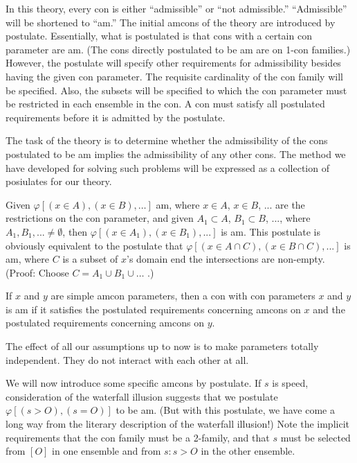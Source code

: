 In this theory, every con is either \enquote{admissible} or \enquote{not admissible.} 
\enquote{Admissible} will be shortened to \enquote{am.} The initial amcons of the theory 
are introduced by postulate. Essentially, what is postulated is that cons with 
a certain con parameter are am. (The cons directly postulated to be am are 
on 1-con families.) However, the postulate will specify other requirements for 
admissibility besides having the given con parameter. The requisite 
cardinality of the con family will be specified. Also, the subsets will be 
specified to which the con parameter must be restricted in each ensemble in 
the con. A con must satisfy all postulated requirements before it is admitted 
by the postulate. 

The task of the theory is to determine whether the admissibility of the 
cons postulated to be am implies the admissibility of any other cons. The 
method we have developed for solving such problems will be expressed as a 
collection of posiulates for our theory. 
\begin{hangers}
 Given $\varphi[(x\in A),(x\in B),\ldots]$ am, where $x\in A$, $x\in B$, ... are the 
restrictions on the con parameter, and given $A_1\subset A$, $B_1\subset B$, ..., where $A_1,B_1,...\neq\emptyset$, then 
$\varphi[(x\in A_1),(x\in B_1),...]$ is am. This postulate is obviously 
equivalent to the postulate that $\varphi[(x\in A\cap C),(x\in B\cap C),...]$ is am, where $C$ is 
a subset of $x$'s domain end the intersections are non-empty. (Proof: Choose 
$C=A_1\cup B_1\cup\ldots$ .) 

 If $x$ and $y$ are simple amcon parameters, then a con with con 
parameters $x$ and $y$ is am if it satisfies the postulated requirements 
concerning amcons on $x$ and the postulated requirements concerning amcons 
on $y$. 
\end{hangers}

The effect of all our assumptions up to now is to make parameters 
totally independent. They do not interact with each other at all. 

We will now introduce some specific amcons by postulate. If $s$ is speed, 
consideration of the waterfall illusion suggests that we postulate 
$\varphi[(s>O),(s=O)]$ to be am. (But with this postulate, we have come a long way from 
the literary description of the waterfall illusion!) Note the implicit 
requirements that the con family must be a 2-family, and that $s$ must be 
selected from $[O]$ in one ensemble and from ${s:s>O}$ in the other ensemble. 

